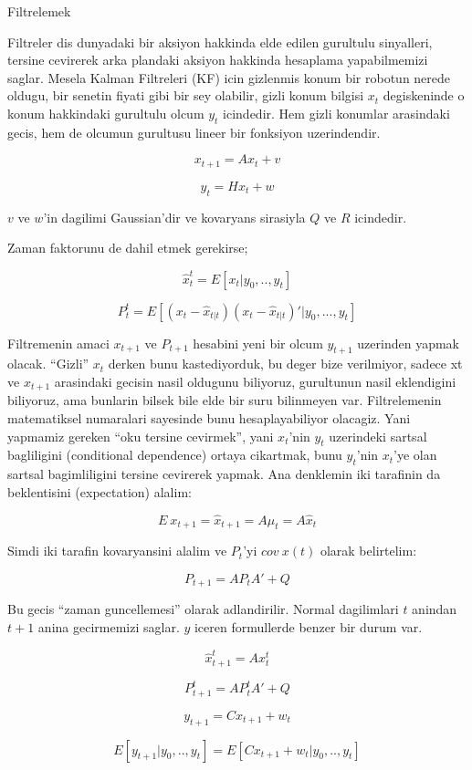 \documentclass[12pt,fleqn]{article}
\begin{document}
Filtrelemek

Filtreler dis dunyadaki bir aksiyon hakkinda elde edilen gurultulu
sinyalleri, tersine cevirerek arka plandaki aksiyon hakkinda hesaplama
yapabilmemizi saglar. Mesela Kalman Filtreleri (KF) icin gizlenmis konum
bir robotun nerede oldugu, bir senetin fiyati gibi bir sey olabilir, gizli
konum bilgisi $x_t$ degiskeninde o konum hakkindaki gurultulu olcum $y_t$
icindedir. Hem gizli konumlar arasindaki gecis, hem de olcumun gurultusu
lineer bir fonksiyon uzerindendir.

\[ x_{t+1} = Ax_t + v \]

\[ y_t = Hx_t + w \]

$v$ ve $w$'in dagilimi Gaussian'dir ve kovaryans sirasiyla $Q$ ve $R$
icindedir. 

Zaman faktorunu de dahil etmek gerekirse;

\[ \hat{x}_t^t = E[x_t|y_0,..,y_t] \]

\[ P_t^t = E[(x_t - \hat{x}_{t|t}) (x_t - \hat{x}_{t|t})'| y_0,...,y_t   ] \]

Filtremenin amaci $x_{t+1}$ ve $P_{t+1}$ hesabini yeni bir olcum $y_{t+1}$
uzerinden yapmak olacak. ``Gizli'' $x_t$ derken bunu kastediyorduk, bu
deger bize verilmiyor, sadece xt ve $x_{t+1}$ arasindaki gecisin nasil oldugunu
biliyoruz, gurultunun nasil eklendigini biliyoruz, ama bunlarin bilsek bile
elde bir suru bilinmeyen var. Filtrelemenin matematiksel numaralari
sayesinde bunu hesaplayabiliyor olacagiz.  Yani yapmamiz gereken ``oku
tersine cevirmek'', yani $x_t$'nin $y_t$ uzerindeki sartsal bagliligini
(conditional dependence) ortaya cikartmak, bunu $y_t$'nin $x_t$'ye olan sartsal
bagimliligini tersine cevirerek yapmak. Ana denklemin iki tarafinin da
beklentisini (expectation) alalim:

\[ E \ x_{t+1} = \hat{x}_{t+1} = A \mu_t = A \hat{x}_t \]

Simdi iki tarafin kovaryansini alalim ve $P_t$'yi $cov \ x(t)$ olarak
belirtelim:

\[ P_{t+1} = AP_tA' + Q \]

Bu gecis ``zaman guncellemesi'' olarak adlandirilir. Normal dagilimlari $t$
anindan $t + 1$ anina gecirmemizi saglar. $y$ iceren formullerde benzer bir
durum var. 

\[ \hat{x}_{t+1}^t = Ax_t^t \]

\[ P_{t+1}^t = AP_t^tA' + Q \]

\[ y_{t+1} = Cx_{t+1} + w_t \]

\[ E[y_{t+1}|y_0,..,y_t] = E[Cx_{t+1} + w_t | y_0,..,y_t] \]
\end{document}
